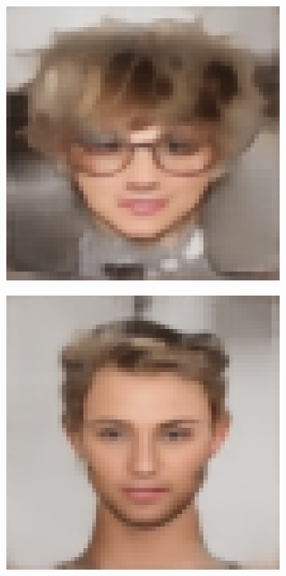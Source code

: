 \documentclass{IEEEcsmag}
\begin{document}
\begin{figure}[ht]
\begin{subfigure}{0.12\textwidth}
    \end{subfigure}
    \begin{subfigure}{0.12\textwidth}
        \includegraphics[width=\linewidth]{Digital sketches/generated_images/image8.jpeg_AE_UNET.png}
    \end{subfigure}
    \begin{subfigure}{0.12\textwidth}
        \includegraphics[width=\linewidth]{Digital sketches/generated_images/image11.jpeg_AE_UNET.png}

\end{subfigure}
\end{figure}
\end{document}
